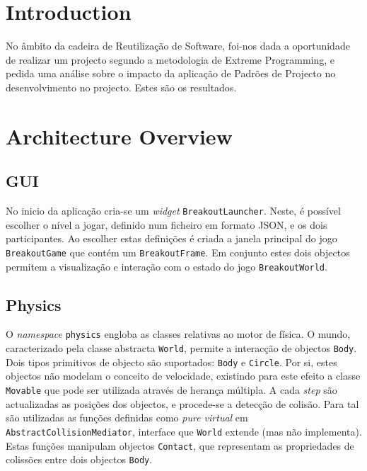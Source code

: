 \documentclass[a4paper]{article}
\title{\documentTitle}
\author{\documentAuthors}
\begin{document}
\renewcommand{\figurename}{Figure}
\maketitle
\cleardoublepage

\tableofcontents
\cleardoublepage

\setlength{\parindent}{1cm}
\setlength{\parskip}{0.3cm}

\hyphenation{}


\section{Introduction}
\noindent No âmbito da cadeira de Reutilização de Software, foi-nos dada a oportunidade de realizar um projecto segundo a metodologia de Extreme Programming, e pedida uma análise sobre o impacto da aplicação de Padrões de Projecto no desenvolvimento no projecto. Estes são os resultados.


\section{Architecture Overview}
\subsection{GUI}

No inicio da aplicação cria-se um \emph{widget} \texttt{BreakoutLauncher}. Neste, é possível escolher o nível a jogar, definido num ficheiro em formato JSON, e os dois participantes. Ao escolher estas definições é criada a janela principal do jogo \texttt{BreakoutGame} que contém um \texttt{BreakoutFrame}. Em conjunto estes dois objectos permitem a visualização e interação com o estado do jogo \texttt{BreakoutWorld}.

\subsection{Physics}
O \emph{namespace} \texttt{physics} engloba as classes relativas ao motor de física. O mundo, caracterizado pela classe abstracta \texttt{World}, permite a interacção de objectos \texttt{Body}. Dois tipos primitivos de objecto são suportados: \texttt{Body} e \texttt{Circle}. Por si, estes objectos não modelam o conceito de velocidade, existindo para este efeito a classe \texttt{Movable} que pode ser utilizada através de herança múltipla. A cada \emph{step} são actualizadas as posições dos objectos, e procede-se a detecção de colisão. Para tal são utilizadas as funções definidas como \emph{pure virtual} em \texttt{AbstractCollisionMediator}, interface que \texttt{World} extende (mas não implementa). Estas funções manipulam objectos \texttt{Contact}, que representam as propriedades de colissões entre dois objectos \texttt{Body}. 
\end{document}
